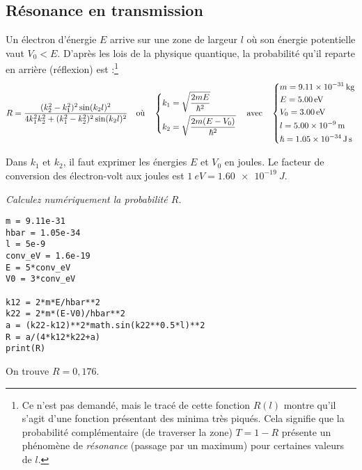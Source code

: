 \subsection{Résonance en transmission}
Un électron d'énergie $E$ arrive sur une zone de largeur $l$ où son énergie potentielle vaut $V_0<E$. D'après les lois de la physique quantique, la probabilité qu'il reparte en arrière (réflexion) est :\footnote{Ce n'est pas demandé, mais le tracé de cette fonction $R(l)$ montre qu'il s'agit d'une fonction présentant des minima très piqués. Cela signifie que la probabilité complémentaire (de traverser la zone) $T=1-R$ présente un phénomène de \emph{résonance} (passage par un maximum) pour certaines valeurs de $l$.}
\begin{align*}
    R=\frac{(k_2^2-k_1^2)^2\sin(k_2l)^2}{4k_1^2k_2^2+(k_1^2-k_2^2)^2\sin(k_2l)^2}
    \quad\text{où}\quad
    \begin{dcases}
        k_1=\sqrt{\frac{2mE}{\hslash^2}}\\
        k_2=\sqrt{\frac{2m(E-V_0)}{\hslash^2}}
    \end{dcases}
    \quad\text{avec}\quad
    \begin{dcases}
        m=\SI{9,11e-31}{kg}\\
        E=\SI{5,00}{eV}\\
        V_0=\SI{3,00}{eV}\\
        l=\SI{5,00e-9}{m}\\
        \hslash=\SI{1,05e-34}{J.s}
    \end{dcases}
\end{align*}

Dans $k_1$ et $k_2$, il faut exprimer les énergies $E$ et $V_0$ en joules. Le facteur de conversion des électron-volt aux joules est $\SI{1}{eV}=\SI{1,60e-19}{J}$.
\begin{Exercise}
{\it Calculez numériquement la probabilité $R$.}
\end{Exercise}
\begin{Answer}
\begin{lstlisting}
m = 9.11e-31
hbar = 1.05e-34
l = 5e-9
conv_eV = 1.6e-19
E = 5*conv_eV
V0 = 3*conv_eV

k12 = 2*m*E/hbar**2
k22 = 2*m*(E-V0)/hbar**2
a = (k22-k12)**2*math.sin(k22**0.5*l)**2
R = a/(4*k12*k22+a)
print(R)
\end{lstlisting}
On trouve $R= 0,176$.
\newpage
\end{Answer} 
